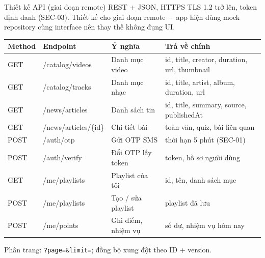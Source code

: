 \begin{frame}{Thiết kế API (giai đoạn remote)}
{\tiny\color{TextGray} REST + JSON, HTTPS TLS 1.2 trở lên, token định danh (SEC-03). Thiết kế cho giai đoạn remote~--~app hiện dùng mock repository cùng interface nên thay thế không đụng UI.}
\vspace{1.2mm}
\begin{center}\tiny
\begin{tabular}{@{}llp{4.4cm}p{5.0cm}@{}}
\toprule
\textbf{Method} & \textbf{Endpoint} & \textbf{Ý nghĩa} & \textbf{Trả về chính} \\
\midrule
GET & /catalog/videos & Danh mục video & id, title, creator, duration, url, thumbnail \\
GET & /catalog/tracks & Danh mục nhạc & id, title, artist, album, duration, url \\
\midrule
GET & /news/articles & Danh sách tin & id, title, summary, source, publishedAt \\
GET & /news/articles/\{id\} & Chi tiết bài & toàn văn, quiz, bài liên quan \\
\midrule
POST & /auth/otp & Gửi OTP SMS & thời hạn 5 phút (SEC-01) \\
POST & /auth/verify & Đổi OTP lấy token & token, hồ sơ người dùng \\
\midrule
GET & /me/playlists & Playlist của tôi & id, tên, danh sách mục \\
POST & /me/playlists & Tạo / sửa playlist & playlist đã lưu \\
POST & /me/points & Ghi điểm, nhiệm vụ & số dư, nhiệm vụ hôm nay \\
\bottomrule
\end{tabular}
\end{center}
\vspace{0.5mm}
{\tiny\color{TextGray} Phân trang: \texttt{?page=\&limit=}; đồng bộ xung đột theo ID + version.}
\end{frame}

